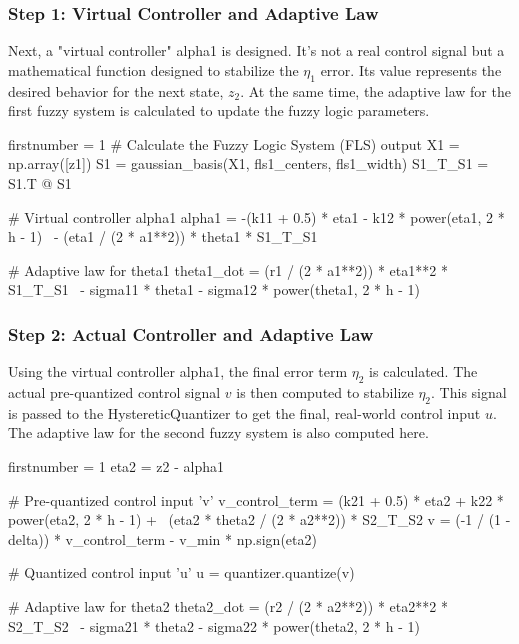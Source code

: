 \subsubsection{Step 1: Virtual Controller and Adaptive Law}
Next, a "virtual controller" alpha1 is designed. It's not a real control signal but a mathematical function designed to stabilize the $\eta_1$ error. Its value represents the desired behavior for the next state, $z_2$. At the same time, the adaptive law for the first fuzzy system is calculated to update the fuzzy logic parameters.
\begin{code}
	\begin{matlabcode}{firstnumber = 1}
# Calculate the Fuzzy Logic System (FLS) output
X1 = np.array([z1]) 
S1 = gaussian_basis(X1, fls1_centers, fls1_width)
S1_T_S1 = S1.T @ S1

# Virtual controller alpha1 
alpha1 = -(k11 + 0.5) * eta1 - k12 * power(eta1, 2 * h - 1) \
- (eta1 / (2 * a1**2)) * theta1 * S1_T_S1

# Adaptive law for theta1 
theta1_dot = (r1 / (2 * a1**2)) * eta1**2 * S1_T_S1 \
- sigma11 * theta1 - sigma12 * power(theta1, 2 * h - 1)
	\end{matlabcode}
	\label{code:p34}
\end{code}
\subsubsection{Step 2: Actual Controller and Adaptive Law}
Using the virtual controller alpha1, the final error term $\eta_2$ is calculated. The actual pre-quantized control signal $v$ is then computed to stabilize $\eta_2$. This signal is passed to the HystereticQuantizer to get the final, real-world control input $u$. The adaptive law for the second fuzzy system is also computed here.
\begin{code}
	\begin{matlabcode}{firstnumber = 1}
eta2 = z2 - alpha1

# Pre-quantized control input 'v'
v_control_term = (k21 + 0.5) * eta2 + k22 * power(eta2, 2 * h - 1) + \
(eta2 * theta2 / (2 * a2**2)) * S2_T_S2
v = (-1 / (1 - delta)) * v_control_term - v_min * np.sign(eta2)

# Quantized control input 'u'
u = quantizer.quantize(v)

# Adaptive law for theta2
theta2_dot = (r2 / (2 * a2**2)) * eta2**2 * S2_T_S2 \
- sigma21 * theta2 - sigma22 * power(theta2, 2 * h - 1)
	\end{matlabcode}
	\label{code:p35}
\end{code}
